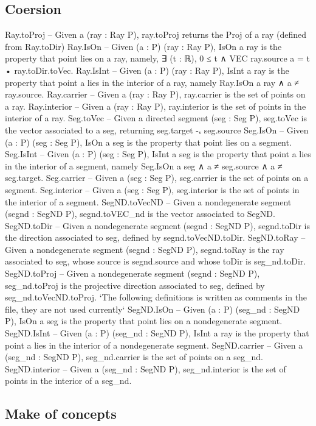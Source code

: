 \documentclass[12pt,a4paper]{article}
\begin{document}
\subsection{Coersion}
Ray.toProj -- Given a (ray : Ray P), ray.toProj returns the Proj of a ray (defined from Ray.toDir)
Ray.IsOn -- Given (a : P) (ray : Ray P), IsOn a ray is the property that point lies on a ray, namely, ∃ (t : ℝ), 0 ≤ t ∧ VEC ray.source a = t • ray.toDir.toVec.
Ray.IsInt -- Given (a : P) (ray : Ray P), IsInt a ray is the property that point a lies in the interior of a ray, namely Ray.IsOn a ray ∧ a ≠ ray.source.
Ray.carrier -- Given a (ray : Ray P), ray.carrier is the set of points on a ray.
Ray.interior -- Given a (ray : Ray P), ray.interior is the set of points in the interior of a ray.
Seg.toVec -- Given a directed segment (seg : Seg P), seg.toVec is the vector associated to a seg, returning seg.target -ᵥ seg.source
Seg.IsOn -- Given (a : P) (seg : Seg P), IsOn a seg is the property that point lies on a segment.
Seg.IsInt -- Given (a : P) (seg : Seg P), IsInt a seg is the property that point a lies in the interior of a segment, namely Seg.IsOn a seg ∧ a ≠ seg.source ∧ a ≠ seg.target.
Seg.carrier -- Given a (seg : Seg P), seg.carrier is the set of points on a segment.
Seg.interior -- Given a (seg : Seg P), seg.interior is the set of points in the interior of a segment.
SegND.toVecND -- Given a nondegenerate segment (segnd : SegND P), segnd.toVEC_nd is the vector associated to SegND.
SegND.toDir -- Given a nondegenerate segment (segnd : SegND P), segnd.toDir is the direction associated to seg, defined by segnd.toVecND.toDir.
SegND.toRay -- Given a nondegenerate segment (segnd : SegND P), segnd.toRay is the ray associated to seg, whose source is segnd.source and whose toDir is seg_nd.toDir.
SegND.toProj -- Given a nondegenerate segment (segnd : SegND P), seg_nd.toProj is the projective direction associated to seg, defined by seg_nd.toVecND.toProj.
`The following definitions is written as comments in the file, they are not used currently`
  SegND.IsOn -- Given (a : P) (seg_nd : SegND P), IsOn a seg is the property that point lies on a nondegenerate segment.
  SegND.IsInt -- Given (a : P) (seg_nd : SegND P), IsInt a ray is the property that point a lies in the interior of a nondegenerate segment.
  SegND.carrier -- Given a (seg_nd : SegND P), seg_nd.carrier is the set of points on a seg_nd.
  SegND.interior -- Given a (seg_nd : SegND P), seg_nd.interior is the set of points in the interior of a seg_nd.


\subsection{Make of concepts}
\end{document}
